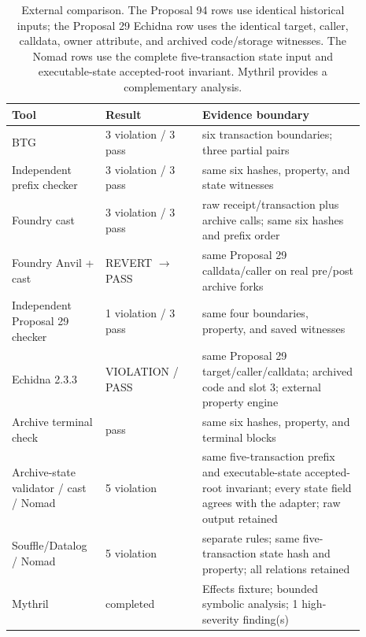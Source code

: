 \begin{table}[t]\centering\scriptsize
\caption{External comparison. The Proposal 94 rows use identical historical inputs; the Proposal 29 Echidna row uses the identical target, caller, calldata, owner attribute, and archived code/storage witnesses. The Nomad rows use the complete five-transaction state input and executable-state accepted-root invariant. Mythril provides a complementary analysis.}
\label{tab:tool-comparison}
\begin{tabular}{@{}p{0.22\linewidth}p{0.25\linewidth}p{0.42\linewidth}@{}}\toprule
Tool & Result & Evidence boundary \\ \midrule
BTG & 3 violation / 3 pass & six transaction boundaries; three partial pairs \\
Independent prefix checker & 3 violation / 3 pass & same six hashes, property, and state witnesses \\
Foundry cast & 3 violation / 3 pass & raw receipt/transaction plus archive calls; same six hashes and prefix order \\
Foundry Anvil + cast & REVERT $\rightarrow$ PASS & same Proposal 29 calldata/caller on real pre/post archive forks \\
Independent Proposal 29 checker & 1 violation / 3 pass & same four boundaries, property, and saved witnesses \\
Echidna 2.3.3 & VIOLATION / PASS & same Proposal 29 target/caller/calldata; archived code and slot 3; external property engine \\
Archive terminal check & pass & same six hashes, property, and terminal blocks \\
Archive-state validator / cast / Nomad & 5 violation & same five-transaction prefix and executable-state accepted-root invariant; every state field agrees with the adapter; raw output retained \\
Souffle/Datalog / Nomad & 5 violation & separate rules; same five-transaction state hash and property; all relations retained \\
Mythril & completed & Effects fixture; bounded symbolic analysis; 1 high-severity finding(s) \\
\bottomrule
\end{tabular}
\end{table}
